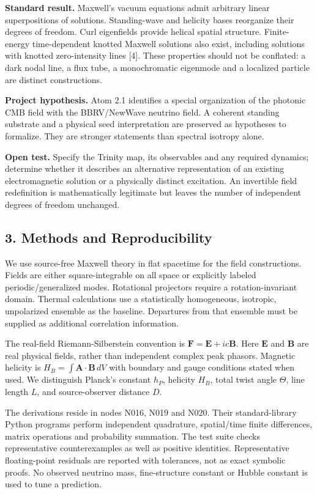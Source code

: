 \documentclass[
  11pt,
]{article}
\begin{document}
\textbf{Standard result.} Maxwell's vacuum equations admit arbitrary
linear superpositions of solutions. Standing-wave and helicity bases
reorganize their degrees of freedom. Curl eigenfields provide helical
spatial structure. Finite-energy time-dependent knotted Maxwell
solutions also exist, including solutions with knotted zero-intensity
lines {[}4{]}. These properties should not be conflated: a dark nodal
line, a flux tube, a monochromatic eigenmode and a localized particle
are distinct constructions.

\textbf{Project hypothesis.} Atom 2.1 identifies a special organization
of the photonic CMB field with the BBRV/NewWave neutrino field. A
coherent standing substrate and a physical seed interpretation are
preserved as hypotheses to formalize. They are stronger statements than
spectral isotropy alone.

\textbf{Open test.} Specify the Trinity map, its observables and any
required dynamics; determine whether it describes an alternative
representation of an existing electromagnetic solution or a physically
distinct excitation. An invertible field redefinition is mathematically
legitimate but leaves the number of independent degrees of freedom
unchanged.

\hypertarget{methods-and-reproducibility}{%
\subsection{3. Methods and
Reproducibility}\label{methods-and-reproducibility}}

We use source-free Maxwell theory in flat spacetime for the field
constructions. Fields are either square-integrable on all space or
explicitly labeled periodic/generalized modes. Rotational projectors
require a rotation-invariant domain. Thermal calculations use a
statistically homogeneous, isotropic, unpolarized ensemble as the
baseline. Departures from that ensemble must be supplied as additional
correlation information.

The real-field Riemann-Silberstein convention is
\(\mathbf F=\mathbf E+ic\mathbf B\). Here \(\mathbf E\) and
\(\mathbf B\) are real physical fields, rather than independent complex
peak phasors. Magnetic helicity is
\(H_B=\int\mathbf A\cdot\mathbf B\,dV\) with boundary and gauge
conditions stated when used. We distinguish Planck's constant \(h_P\),
helicity \(H_B\), total twist angle \(\Theta\), line length \(L\), and
source-observer distance \(D\).

The derivations reside in nodes N016, N019 and N020. Their
standard-library Python programs perform independent quadrature,
spatial/time finite differences, matrix operations and probability
summation. The test suite checks representative counterexamples as well
as positive identities. Representative floating-point residuals are
reported with tolerances, not as exact symbolic proofs. No observed
neutrino mass, fine-structure constant or Hubble constant is used to
tune a prediction.
\end{document}
